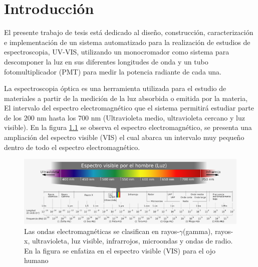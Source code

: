 \chapter{Introducción}
El presente trabajo de tesis está dedicado al diseño, construcción, caracterización e implementación de un sistema automatizado para la realización de estudios de espectroscopia, UV-VIS, utilizando un monocromador como sistema para descomponer la luz  en sus diferentes longitudes de onda y un tubo fotomultiplicador (PMT) para medir la potencia radiante de cada una.

La espectroscopia óptica es una herramienta utilizada para el estudio de materiales a partir de la medición de la luz absorbida o emitida por la materia, El intervalo del espectro electromagnético que el sistema permitirá estudiar parte de los 200 nm hasta los 700 nm (Ultravioleta medio, ultravioleta cercano y luz visible). En la figura \ref{fig:espectrovisible} se observa el espectro electromagnético, se presenta una ampliación del espectro visible (VIS) el cual abarca un intervalo muy pequeño dentro de todo el espectro electromagnético. 
\begin{figure}[h!]%
	\centering
	\includegraphics[width=1\linewidth]{Imagenes/espectro_visible}
	\caption[Espectro electromagnético, enfatizando el espectro visible para el ojo humano \cite{espectroOjo}.]{Las ondas electromagnéticas se clasifican en rayos-$\gamma$(gamma), rayos-x, ultravioleta, luz visible, infrarrojos, microondas y ondas de radio. En la figura se enfatiza en el espectro visible (VIS) para el ojo humano \cite{espectroOjo}}
	\label{fig:espectrovisible}
\end{figure}

